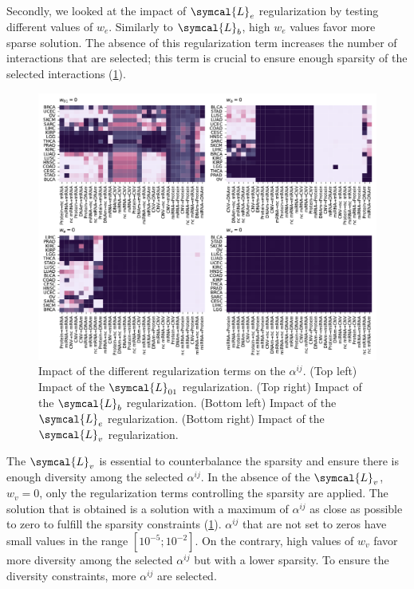 \documentclass[../main.tex]{subfiles}
\begin{document}
		Secondly, we looked at the impact of \(\symcal{L}_e\) regularization by testing different values of \(w_e\).
		Similarly to \(\symcal{L}_b\), high \(w_e\) values favor more sparse solution.
		The absence of this regularization term increases the number of interactions that are selected; this term is crucial to ensure enough sparsity of the selected interactions (\cref{fig:alphas_signature_ablation}).

		\begin{figure}
			\centering
			\includegraphics[width=\textwidth]{ablation_heatmaps.pdf}
			\caption[Impact of the different regularization terms on the \(\alpha^{ij}\)]{Impact of the different regularization terms on the \(\alpha^{ij}\). (Top left) Impact of the \(\symcal{L}_{01}\) regularization. (Top right) Impact of the \(\symcal{L}_{b}\) regularization. (Bottom left) Impact of the \(\symcal{L}_{e}\) regularization. (Bottom right) Impact of the \(\symcal{L}_{v}\) regularization.}
			\label{fig:alphas_signature_ablation}
		\end{figure}

		The \(\symcal{L}_v\) is essential to counterbalance the sparsity and ensure there is enough diversity among the selected \(\alpha^{ij}\).
		In the absence of the \(\symcal{L}_v\), \(w_v = 0\), only the regularization terms controlling the sparsity are applied.
		The solution that is obtained is a solution with a maximum of \(\alpha^{ij}\)  as close as possible to zero to fulfill the sparsity constraints (\cref{fig:alphas_signature_ablation}).
		\(\alpha^{ij}\) that are not set to zeros have small values in the range \(\left[10^{-5}; 10^{-2}\right]\).
		On the contrary, high values of \(w_v\) favor more diversity among the selected \(\alpha^{ij}\) but with a lower sparsity.
		To ensure the diversity constraints, more \(\alpha^{ij}\) are selected.
\end{document}
